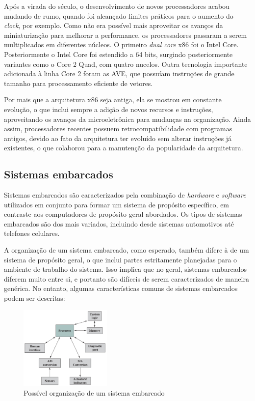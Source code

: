 \documentclass{article}
\begin{document}
Após a virada do século, o desenvolvimento de novos processadores acabou mudando
de rumo, quando foi alcançado limites práticos para o aumento do \textit{clock},
por exemplo. Como não era possível mais aproveitar os avanços da miniaturização
para melhorar a performance, os processadores passaram a serem multiplicados em
diferentes núcleos. O primeiro \textit{dual core} x86 foi o Intel Core.
Posteriormente o Intel Core foi estendido a 64 bits, surgindo posteriormente
variantes como o Core 2 Quad, com quatro nucelos. Outra tecnologia importante
adicionada à linha Core 2 foram as AVE, que possuíam instruções de grande
tamanho para processamento eficiente de vetores.

Por mais que a arquitetura x86 seja antiga, ela se mostrou em constante
evolução, o que inclui sempre a adição de novos recursos e instruções,
aproveitando os avanços da microeletrônica para mudanças na organização. Ainda
assim, processadores recentes possuem retrocompatibilidade com programas
antigos, devido ao fato da arquitetura ter evoluído sem alterar instruções já
existentes, o que colaborou para a manutenção da popularidade da arquitetura.

\subsection{Sistemas embarcados}
Sistemas embarcados são caracterizados pela combinação de \textit{hardware} e
\textit{software} utilizados em conjunto para formar um sistema de propósito
específico, em contraste aos computadores de propósito geral abordados. Os tipos
de sistemas embarcados são dos mais variados, incluindo desde sistemas
automotivos até telefones celulares.

A organização de um sistema embarcado, como esperado, também difere à de um
sistema de propósito geral, o que inclui partes estritamente planejadas para o
ambiente de trabalho do sistema. Isso implica que no geral, sistemas embarcados
diferem muito entre si, e portanto são difíceis de serem caracterizados de
maneira genérica. No entanto, algumas características comuns de sistemas
embarcados podem ser descritas:

\begin{figure}[h]
    \centering
    \includegraphics[width=0.4\textwidth]{embarcado.png}
    \caption{Possível organização de um sistema embarcado}
\end{figure}
\end{document}
